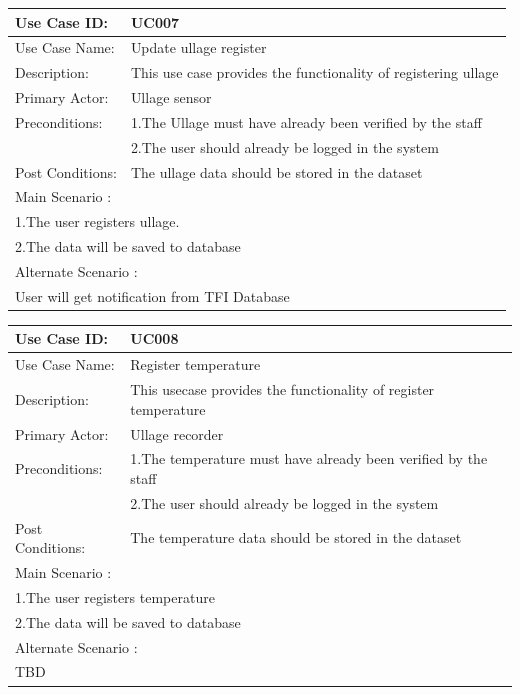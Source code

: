 		\begin{center}	
		\vspace*{1\baselineskip}	
		\begin{tabular}{|l|p{10cm}|}
			\hline
			Use Case ID: & UC007 \\
			\hline
			Use Case Name: & Update ullage register \\
			\hline
			Description: & This use case provides the functionality of registering ullage \\
			\hline
			Primary Actor: & Ullage sensor \\
			\hline
			Preconditions: & 1.The Ullage must have already been verified by the staff\\ 
			& 2.The user should already be logged in the system \\
			\hline
			Post Conditions: & The ullage data should be stored in the dataset\\
			\hline
			\multicolumn{2}{|l|}{Main Scenario :} \\
			\hline
			\multicolumn{2}{|l|}{1.The user registers ullage.} \\
			\multicolumn{2}{|l|}{2.The data will be saved to database} \\
			\hline
			\multicolumn{2}{|l|}{Alternate Scenario :} \\
			\hline
			\multicolumn{2}{|l|}{User will get notification from TFI Database} \\
			\hline
		\end{tabular}
	\end{center}
	
	
	\begin{center}
	\vspace*{1\baselineskip}	
	\begin{tabular}{|l|p{10cm}|}
		\hline
		Use Case ID: & UC008 \\
		\hline
		Use Case Name: & Register temperature \\
		\hline
		Description: & This usecase provides the functionality of register temperature \\
		\hline
		Primary Actor: & Ullage recorder \\
		\hline
		Preconditions: & 1.The temperature must have already been verified by the staff\\ 
		& 2.The user should already be logged in the system \\
		\hline
		Post Conditions: & The temperature data should be stored in the dataset\\
		\hline
		\multicolumn{2}{|l|}{Main Scenario :} \\
		\hline
		\multicolumn{2}{|l|}{1.The user registers temperature} \\
		\multicolumn{2}{|l|}{2.The data will be saved to database } \\
		\multicolumn{2}{|l|}{Alternate Scenario :} \\
		\hline
		\multicolumn{2}{|l|}{TBD} \\
		\hline
	\end{tabular}
\end{center}

